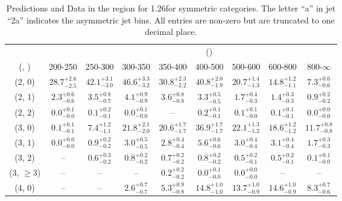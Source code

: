 \begin{table}[h!]
\tiny
\centering
\caption{Predictions and Data in the \mmj region for 1.26\ifb for symmetric categories. The letter ``a'' in jet \eg ``2a''  indicates the asymmetric jet bins. All entries are non-zero but are truncated to one decimal place.\label{tab:prednodata_comb_mumu_sym}}
\begin{tabular}
{ccccccccc}
	\hline\hline
&	& \multicolumn{8}{c}{\scalht (\gev)} \\ 
	 (\njet,  \nb) & 200-250 & 250-300 & 300-350 & 350-400 & 400-500 & 500-600 & 600-800 & 800-$\infty$ \\ [0.8ex] 
\hline
	(2, 0) & $28.7^{+ 2.6 }_{- 2.5 }$ & $42.1^{+ 3.1 }_{- 3.0 }$ & $46.6^{+ 3.3 }_{- 3.2 }$ & $30.8^{+ 2.3 }_{- 2.2 }$ & $40.8^{+ 2.0 }_{- 1.9 }$ & $20.7^{+ 1.4 }_{- 1.3 }$ & $14.8^{+ 1.2 }_{- 1.1 }$ & $7.3^{+ 0.6 }_{- 0.6 }$ \\[0.5ex] 
	(2, 1) & $2.3^{+ 0.6 }_{- 0.6 }$ & $3.5^{+ 0.8 }_{- 0.7 }$ & $4.1^{+ 0.9 }_{- 0.9 }$ & $3.6^{+ 0.8 }_{- 0.8 }$ & $3.3^{+ 0.5 }_{- 0.5 }$ & $1.7^{+ 0.4 }_{- 0.3 }$ & $1.4^{+ 0.3 }_{- 0.3 }$ & $0.9^{+ 0.2 }_{- 0.2 }$ \\[0.5ex] 
	(2, 2) & $0.0^{+ 0.1 }_{- 0.0 }$ & $0.1^{+ 0.2 }_{- 0.1 }$ & $0.0^{+ 0.1 }_{- 0.0 }$ & -- & $0.2^{+ 0.1 }_{- 0.1 }$ & $0.1^{+ 0.1 }_{- 0.0 }$ & $0.1^{+ 0.1 }_{- 0.1 }$ & $0.0^{+ 0.0 }_{- 0.0 }$ \\[0.5ex] 
	(3, 0) & $0.1^{+ 0.1 }_{- 0.1 }$ & $7.4^{+ 1.2 }_{- 1.1 }$ & $21.8^{+ 2.1 }_{- 2.0 }$ & $20.6^{+ 1.7 }_{- 1.7 }$ & $36.9^{+ 1.7 }_{- 1.7 }$ & $22.1^{+ 1.3 }_{- 1.2 }$ & $18.6^{+ 1.2 }_{- 1.2 }$ & $11.7^{+ 0.8 }_{- 0.8 }$ \\[0.5ex] 
	(3, 1) & $0.0^{+ 0.0 }_{- 0.0 }$ & $0.9^{+ 0.2 }_{- 0.2 }$ & $3.0^{+ 0.5 }_{- 0.5 }$ & $2.8^{+ 0.4 }_{- 0.4 }$ & $5.6^{+ 0.6 }_{- 0.6 }$ & $3.0^{+ 0.4 }_{- 0.4 }$ & $3.1^{+ 0.4 }_{- 0.4 }$ & $1.7^{+ 0.3 }_{- 0.3 }$ \\[0.5ex] 
	(3, 2) & -- & $0.6^{+ 0.3 }_{- 0.2 }$ & $0.8^{+ 0.2 }_{- 0.2 }$ & $0.7^{+ 0.2 }_{- 0.2 }$ & $0.8^{+ 0.2 }_{- 0.2 }$ & $0.5^{+ 0.2 }_{- 0.1 }$ & $0.5^{+ 0.2 }_{- 0.1 }$ & $0.1^{+ 0.1 }_{- 0.0 }$ \\[0.5ex] 
	(3, $\ge3$) & -- & -- & -- & $0.2^{+ 0.2 }_{- 0.2 }$ & $0.0^{+ 0.1 }_{- 0.0 }$ & $0.0^{+ 0.0 }_{- 0.0 }$ & -- & -- \\[0.5ex] 
	(4, 0) & -- & -- & $2.6^{+ 0.7 }_{- 0.7 }$ & $5.3^{+ 0.9 }_{- 0.8 }$ & $14.8^{+ 1.0 }_{- 1.0 }$ & $13.7^{+ 1.0 }_{- 0.9 }$ & $14.6^{+ 1.0 }_{- 0.9 }$ & $8.3^{+ 0.7 }_{- 0.6 }$ \\[0.5ex] 

\end{tabular}
\end{table}
